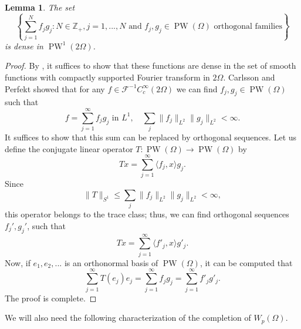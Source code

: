 \documentclass{amsart}
\theoremstyle{plain}
\newtheorem{lm}[theo]{Lemma}
\DeclareMathOperator{\PW}{PW}
\begin{document}
\begin{lm}\label{sumsdense}
	The set
	$$\left\{ \sum_{j=1}^{N}f_jg_j: N\in\mathbb{Z}_+, j=1,...,N\text{ and } f_j,g_j\in \PW(\Omega) \text{ orthogonal families} \right\}$$
	is dense in $\PW^1(2\Omega)$.
\end{lm}
\begin{proof}
	By \cite[Lemma 2.6]{bampouras2026boundaryweightedfourierinequalitiesconvex}, it suffices to show that these functions are dense in the set of smooth functions with compactly supported Fourier transform in $2\Omega$. Carlsson and Perfekt \cite[proof of Proposition 5.1]{MR4227573} showed that for any $f\in \mathcal{F}^{-1}C_c^\infty(2\Omega)$ we can find $f_j,g_j\in \PW(\Omega)$ such that
	$$f=\sum_{j=1}^{\infty} f_jg_j\text{ in $L^1$},\quad \sum_j \|f_j\|_{L^2}\|g_j\|_{L^2}<\infty.$$
	It suffices to show that this sum can be replaced by orthogonal sequences. Let us define the conjugate linear operator $T:\PW(\Omega)\to \PW(\Omega)$ by
	$$Tx=\sum_{j=1}^\infty\langle f_j,x\rangle g_j.$$ Since 
	$$\|T\|_{S^1}\leq \sum_j \|f_j\|_{L^2}\|g_j\|_{L^2}<\infty,$$
	this operator belongs to the trace class; thus, we can find orthogonal sequences $f_j',g_j'$, such that
	$$Tx=\sum_{j=1}^{\infty} \langle f'_j,x\rangle g'_j.$$ Now, if $e_1,e_2,...$ is an orthonormal basis of $\PW(\Omega)$, it can be computed that
	$$\sum_{j=1}^\infty T(e_j)e_j=\sum_{j=1}^\infty f_jg_j =\sum_{j=1}^\infty f'_jg'_j.$$
	The proof is complete.
\end{proof}

We will also need the following characterization of the completion of $W_p(\Omega)$.
\end{document}
